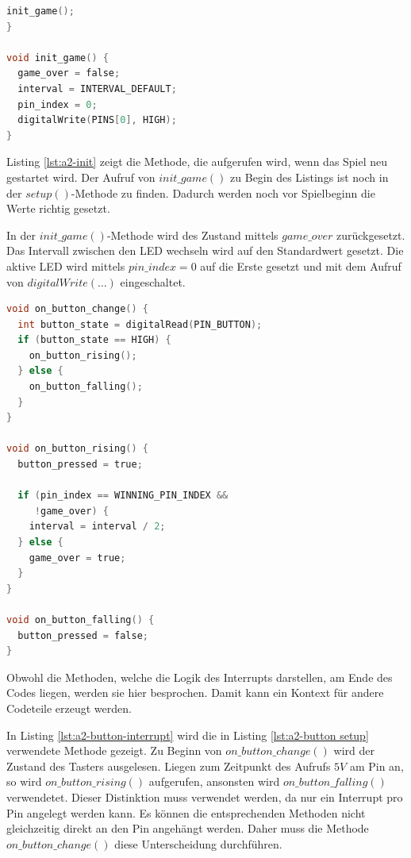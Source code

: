 \begin{lstlisting}[language=C,label={lst:a2-init}, caption={Setzen der Standardwerte}]
  init_game();
}

void init_game() {
  game_over = false;
  interval = INTERVAL_DEFAULT;
  pin_index = 0;
  digitalWrite(PINS[0], HIGH);
}
\end{lstlisting}

Listing \ref{lst:a2-init} zeigt die Methode, die aufgerufen wird, wenn das Spiel neu gestartet wird.
Der Aufruf von $init\_game()$ zu Begin des Listings ist noch in der $setup()$-Methode zu finden.
Dadurch werden noch vor Spielbeginn die Werte richtig gesetzt.

In der $init\_game()$-Methode wird des Zustand mittels $game\_over$ zurückgesetzt.
Das Intervall zwischen den LED wechseln wird auf den Standardwert gesetzt.
Die aktive LED wird mittels $pin\_index = 0$ auf die Erste gesetzt und mit dem Aufruf von $digitalWrite(\dots)$ eingeschaltet.

\begin{lstlisting}[language=C,label={lst:a2-button-interrupt}, caption={Interrupt Methoden des Tasters}]
void on_button_change() {
  int button_state = digitalRead(PIN_BUTTON);
  if (button_state == HIGH) {
   	on_button_rising();
  } else {
    on_button_falling();
  }
}

void on_button_rising() {
  button_pressed = true;

  if (pin_index == WINNING_PIN_INDEX &&
     !game_over) {
    interval = interval / 2;
  } else {
    game_over = true;
  }
}

void on_button_falling() {
  button_pressed = false;
}
\end{lstlisting}

Obwohl die Methoden, welche die Logik des Interrupts darstellen, am Ende des Codes liegen, werden sie hier besprochen.
Damit kann ein Kontext für andere Codeteile erzeugt werden.

In Listing \ref{lst:a2-button-interrupt} wird die in Listing \ref{lst:a2-button setup} verwendete Methode gezeigt.
Zu Beginn von $on\_button\_change()$ wird der Zustand des Tasters ausgelesen.
Liegen zum Zeitpunkt des Aufrufs $5V$ am Pin an, so wird $on\_button\_rising()$ aufgerufen, ansonsten wird $on\_button\_falling()$ verwendetet.
Dieser Distinktion muss verwendet werden, da nur ein Interrupt pro Pin angelegt werden kann.
Es können die entsprechenden Methoden nicht gleichzeitig direkt an den Pin angehängt werden.
Daher muss die Methode $on\_button\_change()$ diese Unterscheidung durchführen.


